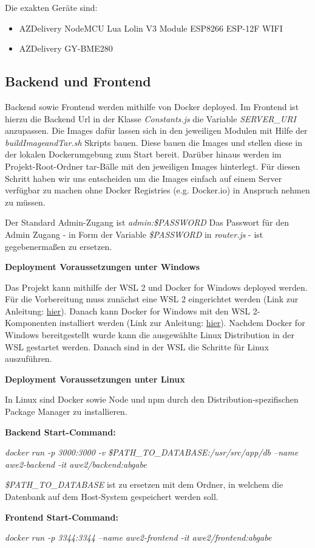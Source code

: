 Die exakten Geräte sind:

\begin{itemize}
	\item AZDelivery NodeMCU Lua Lolin V3 Module ESP8266 ESP-12F WIFI
	\item AZDelivery GY-BME280
\end{itemize}

\subsection{Backend und Frontend}

Backend sowie Frontend werden mithilfe von Docker deployed. Im Frontend ist hierzu die Backend Url in der Klasse \textit{Constants.js} die Variable \textit{SERVER\_URI} anzupassen. Die Images dafür lassen sich in den jeweiligen Modulen mit Hilfe der \textit{buildImageandTar.sh} Skripts bauen. Diese bauen die Images und stellen diese in der lokalen Dockerumgebung zum Start bereit. Darüber hinaus werden im Projekt-Root-Ordner tar-Bälle mit den jeweiligen Images hinterlegt. Für diesen Schritt haben wir uns entscheiden um die Images einfach auf einem Server verfügbar zu machen ohne Docker Registries (e.g. Docker.io) in Anspruch nehmen zu müssen.

Der Standard Admin-Zugang ist \textit{admin:\$PASSWORD} Das Passwort für den Admin Zugang - in Form der Variable \textit{\$PASSWORD} in \textit{router.js} - ist gegebenermaßen zu ersetzen.

\textbf{Deployment Voraussetzungen unter Windows}

Das Projekt kann mithilfe der WSL 2 und Docker for Windows deployed werden. Für die Vorbereitung muss zunächst eine WSL 2 eingerichtet werden (Link zur Anleitung: \href{https://docs.microsoft.com/en-us/windows/wsl/install-win10}{hier}). Danach kann Docker for Windows mit den WSL 2-Komponenten installiert werden (Link zur Anleitung: \href{https://docs.docker.com/docker-for-windows/wsl/}{hier}). Nachdem Docker for Windows bereitgestellt wurde kann die ausgewählte Linux Distribution in der WSL gestartet werden. Danach sind in der WSL die Schritte für Linux auszuführen.

\textbf{Deployment Voraussetzungen unter Linux}

In Linux sind Docker sowie Node und npm durch den Distribution-spezifischen Package Manager zu installieren.

\textbf{Backend Start-Command:}

\textit{docker run -p 3000:3000 -v \$PATH\_TO\_DATABASE:/usr/src/app/db --name awe2-backend -it awe2/backend:abgabe}

\textit{\$PATH\_TO\_DATABASE} ist zu ersetzen mit dem Ordner, in welchem die Datenbank auf dem Host-System gespeichert werden soll.

\textbf{Frontend Start-Command:}

\textit{docker run -p 3344:3344 --name awe2-frontend -it awe2/frontend:abgabe}